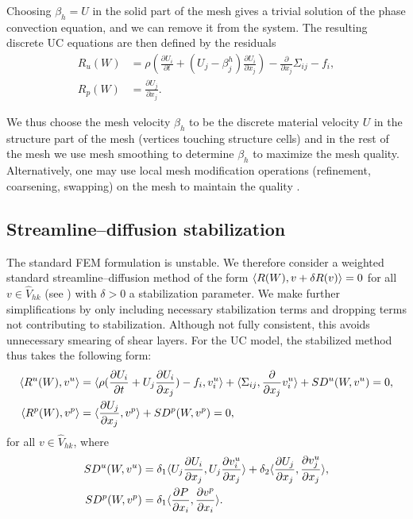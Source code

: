 Choosing $\beta_h = U$ in the solid part of the mesh gives a trivial
solution of the phase convection equation, and we can remove it from
the system. The resulting discrete UC equations are then defined by the residuals
\begin{equation}
  \begin{split}\label{eq:ALE}
    R_u(W) &= \rho\left(\frac{\partial U_i}{\partial t} + (U_j - \beta^h_j) \frac{\partial U_i}{\partial x_j} \right) - \frac{\partial}{\partial x_j} \Sigma_{ij} - f_i,
    \\
    R_p(W) &= \frac{\partial U_j}{\partial x_j}.
  \end{split}
\end{equation}

We thus choose the mesh velocity $\beta_h$ to be the discrete material
velocity $U$ in the structure part of the mesh (vertices touching
structure cells) and in the rest of the mesh we use mesh smoothing to
determine $\beta_h$ to maximize the mesh quality. Alternatively, one
may use local mesh modification operations (refinement, coarsening,
swapping) on the mesh to maintain the quality
\citep{Comp`ereRemacleJanssonEtAl2009}.

\subsection{Streamline--diffusion stabilization}

The standard FEM formulation is unstable.  We therefore consider a
weighted standard streamline--diffusion method of the form
$\langle R(W), v + \delta R(v) \rangle = 0$ for all $v \in \hat{V}_{hk}$ (see
\citet{ErikssonEstepHansboEtAl1996}) with $\delta > 0$ a stabilization
parameter. We make further simplifications by only including necessary
stabilization terms and dropping terms not contributing to
stabilization. Although not fully consistent, this avoids unnecessary
smearing of shear layers. For the UC model, the stabilized method thus
takes the following form:
\begin{align}
  \langle R^u(W), v^u \rangle &=
  \langle \rho(\frac{\partial U_i}{\partial t} + U_j \frac{\partial U_i}{\partial x_j} ) - f_i, v^u_i \rangle +
  \langle \Sigma_{ij}, \frac{\partial}{\partial x_j} v^u_i \rangle + SD^u(W, v^u) = 0, \\
  \langle R^p(W), v^p \rangle &= \langle \frac{\partial U_j}{\partial x_j}, v^p \rangle + SD^p(W, v^p) = 0,
\end{align}
for all $v \in \hat{V}_{hk}$, where
\begin{align}
  SD^u(W, v^u) &=
  \delta_1 \langle U_j \frac{\partial U_i}{\partial x_j}, U_j \frac{\partial v^u_i}{\partial x_j}  \rangle +
  \delta_2 \langle \frac{\partial U_j}{\partial x_j}, \frac{\partial v^u_j}{\partial x_j}  \rangle, \\
  SD^p(W, v^p) &= \delta_1 \langle \frac{\partial P}{\partial x_i}, \frac{\partial v^p}{\partial x_i} \rangle.
\end{align}

